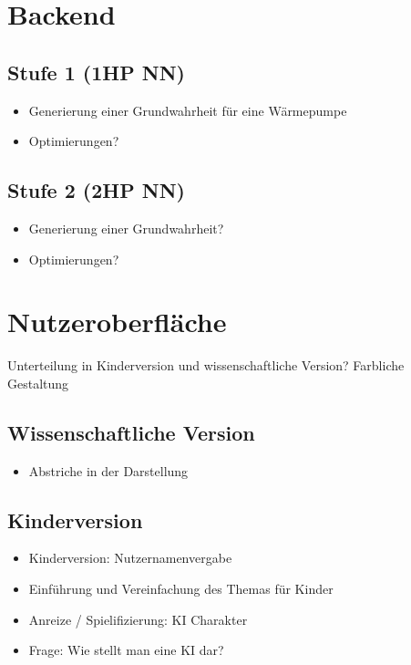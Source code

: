 \documentclass[a4paper]{extarticle}
\begin{document}
    \section{Backend}
    \subsection{Stufe 1 (1HP NN)}
    \begin{itemize}
        \item Generierung einer Grundwahrheit für eine Wärmepumpe
        \item Optimierungen?
    \end{itemize}
    
    \subsection{Stufe 2 (2HP NN)}
    \begin{itemize}
        \item Generierung einer Grundwahrheit?
        \item Optimierungen?
    \end{itemize}

    \section{Nutzeroberfläche}

    Unterteilung in Kinderversion und wissenschaftliche Version?
    Farbliche Gestaltung
    
    \subsection{Wissenschaftliche Version}
    \begin{itemize}
        \item Abstriche in der Darstellung
    \end{itemize}

    \subsection{Kinderversion}
    \begin{itemize}
        \item Kinderversion: Nutzernamenvergabe
        \item Einführung und Vereinfachung des Themas für Kinder 
        \item Anreize / Spielifizierung: KI Charakter
        \item Frage: Wie stellt man eine KI dar?
    \end{itemize}
    
\end{document}
